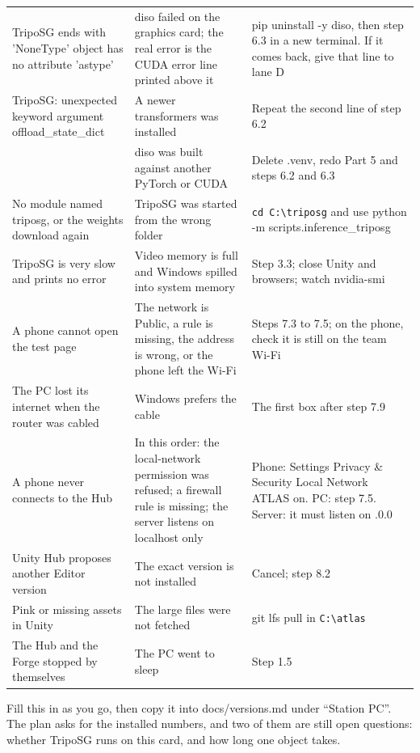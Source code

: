 \documentclass[10pt]{article}
\newcommand{\cc}{\lstinline[style=inl]}
\newcommand{\code}[1]{{\ttfamily\fontsize{8.8}{11}\selectfont #1}}
\newcommand{\h}[1]{\par\vspace{4mm}{\fontsize{11.5}{14}\selectfont\bfseries\color{ink}#1}\par\vspace{1.4mm}}
\newcommand{\m}{\,\textrm{\guilsinglright}\,}
\begin{document}
{\begin{tabular}{@{}>{\raggedright\arraybackslash}p{55mm}@{\hspace{4mm}}>{\raggedright\arraybackslash}p{50mm}@{\hspace{4mm}}>{\raggedright\arraybackslash}p{65mm}@{}}
TripoSG ends with \code{'NoneType' object has no attribute 'astype'} & \code{diso} failed on the graphics card; the real error is the \code{CUDA error} line printed above it & \code{pip uninstall -y diso}, then step 6.3 in a new terminal. If it comes back, give that line to lane D\\
TripoSG: unexpected keyword argument \code{offload\_state\_dict} & A newer \code{transformers} was installed & Repeat the second line of step 6.2\\
\code{DLL load failed while importing \_C} & \code{diso} was built against another PyTorch or CUDA & Delete \code{.venv}, redo Part 5 and steps 6.2 and 6.3\\
No module named \code{triposg}, or the weights download again & TripoSG was started from the wrong folder & \cc!cd C:\triposg! and use \code{python -m scripts.inference\_triposg}\\
TripoSG is very slow and prints no error & Video memory is full and Windows spilled into system memory & Step 3.3; close Unity and browsers; watch \code{nvidia-smi}\\
A phone cannot open the test page & The network is Public, a rule is missing, the address is wrong, or the phone left the Wi-Fi & Steps 7.3 to 7.5; on the phone, check it is still on the team Wi-Fi\\
The PC lost its internet when the router was cabled & Windows prefers the cable & The first box after step 7.9\\
A phone never connects to the Hub & In this order: the local-network permission was refused; a firewall rule is missing; the server listens on \code{localhost} only & Phone: Settings\m Privacy \& Security\m Local Network\m ATLAS on. PC: step 7.5. Server: it must listen on \code{0.0.0.0}\\
Unity Hub proposes another Editor version & The exact version is not installed & Cancel; step 8.2\\
Pink or missing assets in Unity & The large files were not fetched & \code{git lfs pull} in \cc!C:\atlas!\\
The Hub and the Forge stopped by themselves & The PC went to sleep & Step 1.5\\
\bottomrule
\end{tabular}}

\h{Record sheet}
Fill this in as you go, then copy it into \code{docs/versions.md} under ``Station PC''. The plan asks for the installed
numbers, and two of them are still open questions: whether TripoSG runs on this card, and how long one object takes.
\end{document}
